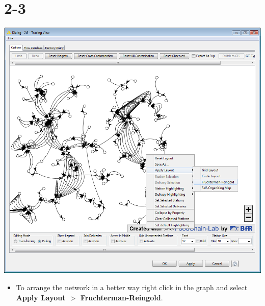 \documentclass[10pt]{beamer}
\begin{document}
\section{2-3}
\begin{frame}
	\begin{center}
  		\includegraphics[height=0.6\textheight]{2-3.png}
	\end{center}
	\begin{itemize}
		\item To arrange the network in a better way right click in the graph and select \textbf{Apply Layout $>$ Fruchterman-Reingold}.
	\end{itemize}
\end{frame}
\end{document}
